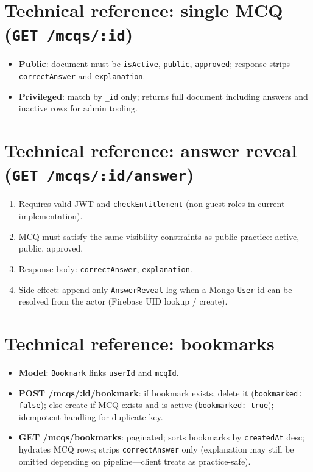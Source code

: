 \documentclass[11pt,a4paper]{article}
\begin{document}
\section{Technical reference: single MCQ (\texttt{GET /mcqs/:id})}

\begin{itemize}[leftmargin=*]
  \item \textbf{Public}: document must be \texttt{isActive}, \texttt{public}, \texttt{approved}; response strips \texttt{correctAnswer} and \texttt{explanation}.
  \item \textbf{Privileged}: match by \texttt{\_id} only; returns full document including answers and inactive rows for admin tooling.
\end{itemize}

\section{Technical reference: answer reveal (\texttt{GET /mcqs/:id/answer})}

\begin{enumerate}[nosep]
  \item Requires valid JWT and \texttt{checkEntitlement} (non-guest roles in current implementation).
  \item MCQ must satisfy the same visibility constraints as public practice: active, public, approved.
  \item Response body: \texttt{correctAnswer}, \texttt{explanation}.
  \item Side effect: append-only \texttt{AnswerReveal} log when a Mongo \texttt{User} id can be resolved from the actor (Firebase UID lookup / create).
\end{enumerate}

\section{Technical reference: bookmarks}

\begin{itemize}[leftmargin=*]
  \item \textbf{Model}: \texttt{Bookmark} links \texttt{userId} and \texttt{mcqId}.
  \item \textbf{POST /mcqs/:id/bookmark}: if bookmark exists, delete it (\texttt{bookmarked: false}); else create if MCQ exists and is active (\texttt{bookmarked: true}); idempotent handling for duplicate key.
  \item \textbf{GET /mcqs/bookmarks}: paginated; sorts bookmarks by \texttt{createdAt} desc; hydrates MCQ rows; strips \texttt{correctAnswer} only (explanation may still be omitted depending on pipeline---client treats as practice-safe).
\end{itemize}
\end{document}
